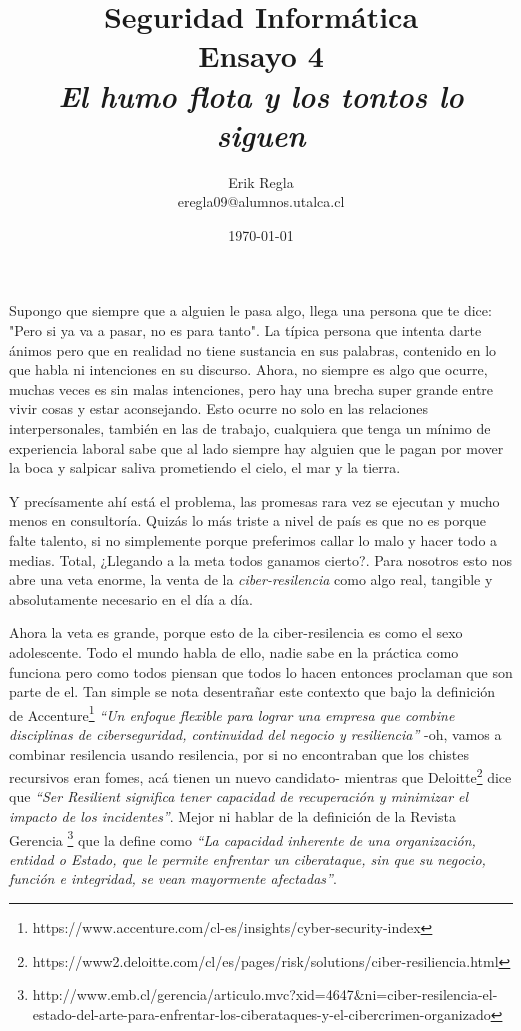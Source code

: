 \documentclass[11pt]{utalcaDoc}
\title{{\bf Seguridad Informática}\\ Ensayo 4 \\\textit{El humo flota y los tontos lo siguen}}
\author{Erik Regla\\ eregla09@alumnos.utalca.cl}
\date{\today}
\begin{document}
\maketitle

Supongo que siempre que a alguien le pasa algo, llega una persona que te dice: "Pero si ya va a pasar, no es para tanto". La típica persona que intenta darte ánimos pero que en realidad no tiene sustancia en sus palabras, contenido en lo que habla ni intenciones en su discurso. Ahora, no siempre es algo que ocurre, muchas veces es sin malas intenciones, pero hay una brecha super grande entre vivir cosas y estar aconsejando. Esto ocurre no solo en las relaciones interpersonales, también en las de trabajo, cualquiera que tenga un mínimo de experiencia laboral sabe que al lado siempre hay alguien que le pagan por mover la boca y salpicar saliva prometiendo el cielo, el mar y la tierra.

Y precísamente ahí está el problema, las promesas rara vez se ejecutan y mucho menos en consultoría. Quizás lo más triste a nivel de país es que no es porque falte talento, si no simplemente porque preferimos callar lo malo y hacer todo a medias. Total, ¿Llegando a la meta todos ganamos cierto?. Para nosotros esto nos abre una veta enorme, la venta de la \textit{ciber-resilencia} como algo real, tangible y absolutamente necesario en el día a día.

Ahora la veta es grande, porque esto de la ciber-resilencia es como el sexo adolescente. Todo el mundo habla de ello, nadie sabe en la práctica como funciona pero como todos piensan que todos lo hacen entonces proclaman que son parte de el. Tan simple se nota desentrañar este contexto que bajo la definición de Accenture\footnote{https://www.accenture.com/cl-es/insights/cyber-security-index} \textit{``Un enfoque flexible para lograr una empresa que combine disciplinas de ciberseguridad, continuidad del negocio y resiliencia''} -oh, vamos a combinar resilencia usando resilencia, por si no encontraban que los chistes recursivos eran fomes, acá tienen un nuevo candidato- mientras que Deloitte\footnote{https://www2.deloitte.com/cl/es/pages/risk/solutions/ciber-resiliencia.html} dice que \textit{``Ser Resilient significa tener capacidad de recuperación y minimizar el impacto de los incidentes''}. Mejor ni hablar de la definición de la Revista Gerencia 
\footnote{http://www.emb.cl/gerencia/articulo.mvc?xid=4647\&ni=ciber-resilencia-el-estado-del-arte-para-enfrentar-los-ciberataques-y-el-cibercrimen-organizado}
que la define como \textit{``La capacidad inherente de una organización, entidad o Estado, que le permite enfrentar un ciberataque, sin que su negocio, función e integridad, se vean mayormente afectadas''}.
\end{document}
